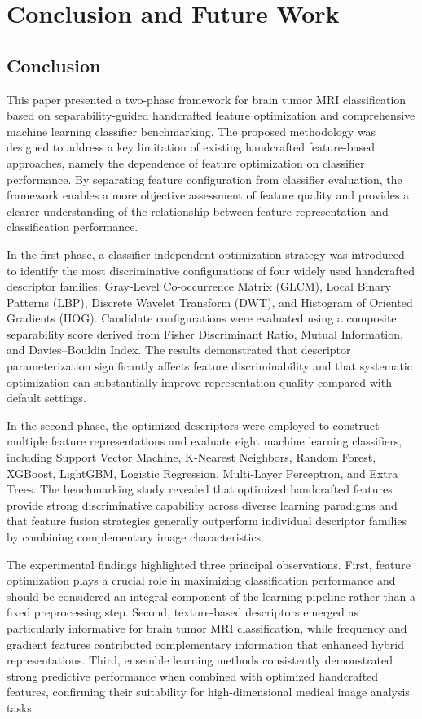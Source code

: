 \section{Conclusion and Future Work}
\label{sec:conclusion}

\subsection{Conclusion}
\label{sec:concl_summary}

This paper presented a two-phase framework for brain tumor MRI classification based
on separability-guided handcrafted feature optimization and comprehensive machine
learning classifier benchmarking. The proposed methodology was designed to address
a key limitation of existing handcrafted feature-based approaches, namely the
dependence of feature optimization on classifier performance. By separating feature
configuration from classifier evaluation, the framework enables a more objective
assessment of feature quality and provides a clearer understanding of the
relationship between feature representation and classification performance.

In the first phase, a classifier-independent optimization strategy was introduced
to identify the most discriminative configurations of four widely used handcrafted
descriptor families: Gray-Level Co-occurrence Matrix (GLCM), Local Binary Patterns
(LBP), Discrete Wavelet Transform (DWT), and Histogram of Oriented Gradients (HOG).
Candidate configurations were evaluated using a composite separability score derived
from Fisher Discriminant Ratio, Mutual Information, and Davies--Bouldin Index. The
results demonstrated that descriptor parameterization significantly affects feature
discriminability and that systematic optimization can substantially improve
representation quality compared with default settings.

In the second phase, the optimized descriptors were employed to construct multiple
feature representations and evaluate eight machine learning classifiers, including
Support Vector Machine, K-Nearest Neighbors, Random Forest, XGBoost, LightGBM,
Logistic Regression, Multi-Layer Perceptron, and Extra Trees. The benchmarking
study revealed that optimized handcrafted features provide strong discriminative
capability across diverse learning paradigms and that feature fusion strategies
generally outperform individual descriptor families by combining complementary
image characteristics.

The experimental findings highlighted three principal observations. First, feature
optimization plays a crucial role in maximizing classification performance and should
be considered an integral component of the learning pipeline rather than a fixed
preprocessing step. Second, texture-based descriptors emerged as particularly
informative for brain tumor MRI classification, while frequency and gradient
features contributed complementary information that enhanced hybrid representations.
Third, ensemble learning methods consistently demonstrated strong predictive
performance when combined with optimized handcrafted features, confirming their
suitability for high-dimensional medical image analysis tasks.

